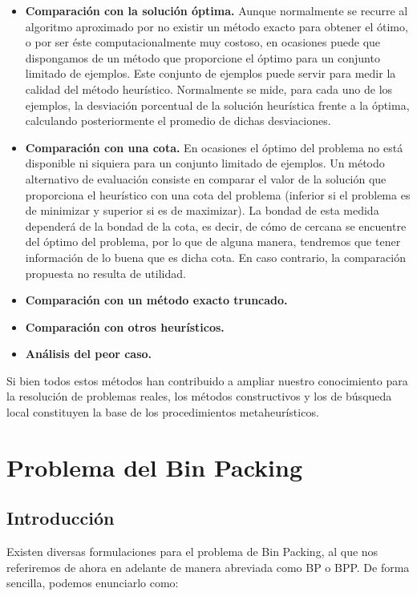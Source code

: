 \documentclass[a4paper, 12pt, oneside]{book}
\begin{document}
	\begin{itemize}
		\item \textbf{Comparaci\'on con la soluci\'on \'optima.} Aunque normalmente se recurre al algoritmo aproximado por no existir un m\'etodo exacto para obtener el \'otimo, o por ser \'este computacionalmente muy costoso, en ocasiones puede que dispongamos de un m\'etodo que proporcione el \'optimo para un conjunto limitado de ejemplos. Este conjunto de ejemplos puede servir para medir la calidad del m\'etodo heur\'istico. Normalmente se mide, para cada uno de los ejemplos, la desviaci\'on porcentual de la soluci\'on heur\'istica frente a la \'optima, calculando posteriormente el promedio de dichas desviaciones.
		\item \textbf{Comparaci\'on con una cota.}  En ocasiones el \'optimo del problema no est\'a disponible ni siquiera para un conjunto limitado de ejemplos. Un m\'etodo alternativo de evaluaci\'on consiste en comparar el valor de la soluci\'on que proporciona el heur\'istico con una cota del problema (inferior si el problema es de minimizar y superior si es de maximizar). La bondad de esta medida depender\'a de la bondad de la cota, es decir, de c\'omo de cercana se encuentre del \'optimo del problema, por lo que de alguna manera, tendremos que tener informaci\'on de lo buena que es dicha cota. En caso contrario, la comparaci\'on propuesta no resulta de utilidad.
		\item \textbf{Comparaci\'on con un m\'etodo exacto truncado.}
		\item \textbf{Comparaci\'on con otros heur\'isticos.}
		\item \textbf{An\'alisis del peor caso.}
	\end{itemize}
	
	Si bien todos estos m\'etodos han contribuido a ampliar nuestro conocimiento para la resoluci\'on de problemas reales, los m\'etodos constructivos y los de b\'usqueda local constituyen la base de los procedimientos metaheur\'isticos.
	
	
	
	
	\chapter{Problema del Bin Packing}
	
	\section{Introducci\'on}
	Existen diversas formulaciones para el problema de Bin Packing, al que nos referiremos de ahora en adelante de manera abreviada como BP o BPP. De forma sencilla, podemos enunciarlo como:
	
\end{document}
